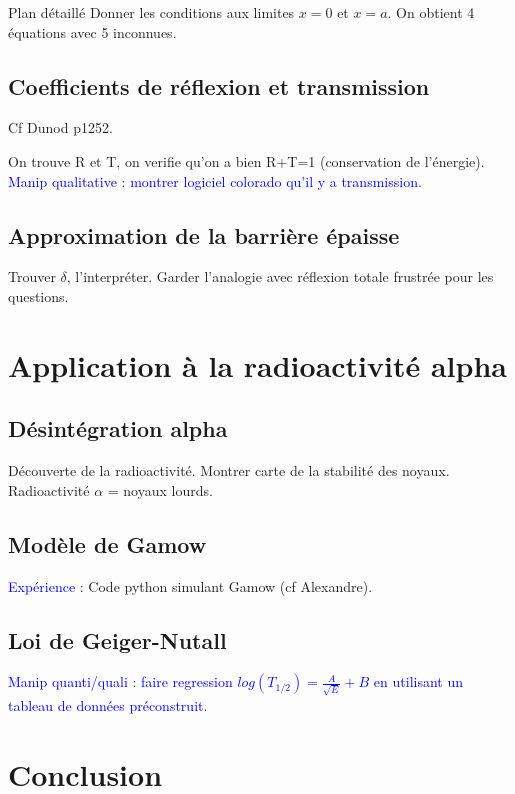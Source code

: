 \begin{reportBlock}{Plan détaillé}
Donner les conditions aux limites $x=0$ et $x=a$. On obtient 4 équations avec 5 inconnues.



\subsection{Coefficients de réflexion et transmission}
Cf Dunod p1252.


On trouve R et T, on verifie qu'on a bien R+T=1 (conservation de l'énergie). \\

\textcolor{blue}{Manip qualitative : montrer logiciel colorado qu'il y a transmission.}

\subsection{Approximation de la barrière épaisse}
Trouver $\delta$, l'interpréter. Garder l'analogie avec réflexion totale frustrée pour les questions.

\section{Application à la radioactivité alpha}

\subsection{Désintégration alpha}
Découverte de la radioactivité. Montrer carte de la stabilité des noyaux. Radioactivité $\alpha$ = noyaux lourds.
\subsection{Modèle de Gamow}
\textcolor{blue}{Expérience :} Code python simulant Gamow (cf Alexandre).

\subsection{Loi de Geiger-Nutall}
\textcolor{blue}{Manip quanti/quali : faire regression $log(T_{1/2}) = \frac{A}{\sqrt{E}}+B$ en utilisant un tableau de données préconstruit.}

\section*{Conclusion}


\end{reportBlock}